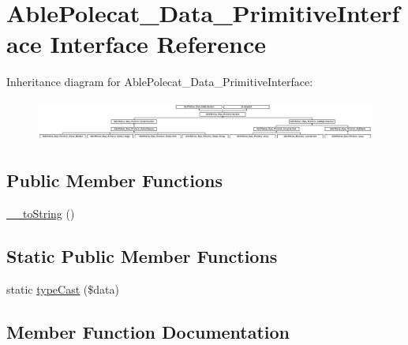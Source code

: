 \hypertarget{interface_able_polecat___data___primitive_interface}{}\section{Able\+Polecat\+\_\+\+Data\+\_\+\+Primitive\+Interface Interface Reference}
\label{interface_able_polecat___data___primitive_interface}
Inheritance diagram for Able\+Polecat\+\_\+\+Data\+\_\+\+Primitive\+Interface\+:\begin{figure}[H]
\begin{center}
\leavevmode
\includegraphics[height=1.388889cm]{interface_able_polecat___data___primitive_interface}
\end{center}
\end{figure}
\subsection*{Public Member Functions}
\begin{DoxyCompactItemize}
\item 
\hyperlink{interface_able_polecat___data___primitive_interface_a7516ca30af0db3cdbf9a7739b48ce91d}{\+\_\+\+\_\+to\+String} ()
\end{DoxyCompactItemize}
\subsection*{Static Public Member Functions}
\begin{DoxyCompactItemize}
\item 
static \hyperlink{interface_able_polecat___data___primitive_interface_a68640750b79d1cdda3cddcece68a207e}{type\+Cast} (\$data)
\end{DoxyCompactItemize}


\subsection{Member Function Documentation}
\hypertarget{interface_able_polecat___data___primitive_interface_a7516ca30af0db3cdbf9a7739b48ce91d}{}
